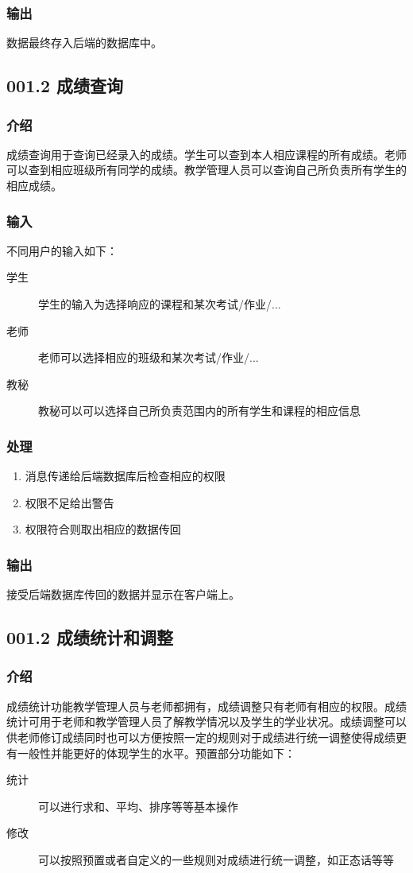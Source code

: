     \subsubsection{输出}
    数据最终存入后端的数据库中。

  \subsection{001.2 成绩查询}
    \subsubsection{介绍}
    成绩查询用于查询已经录入的成绩。学生可以查到本人相应课程的所有成绩。老师可以查到相应班级所有同学的成绩。教学管理人员可以查询自己所负责所有学生的相应成绩。
    \subsubsection{输入}
    不同用户的输入如下：
    \begin{center}\begin{description}
      \item[学生] 学生的输入为选择响应的课程和某次考试/作业/...
      \item[老师] 老师可以选择相应的班级和某次考试/作业/...
      \item[教秘] 教秘可以可以选择自己所负责范围内的所有学生和课程的相应信息
    \end{description}\end{center}
    \subsubsection{处理}
    \begin{enumerate}
      \item 消息传递给后端数据库后检查相应的权限
      \item 权限不足给出警告
      \item 权限符合则取出相应的数据传回
    \end{enumerate}
    \subsubsection{输出}
    接受后端数据库传回的数据并显示在客户端上。

  \subsection{001.2 成绩统计和调整}
    \subsubsection{介绍}
    成绩统计功能教学管理人员与老师都拥有，成绩调整只有老师有相应的权限。成绩统计可用于老师和教学管理人员了解教学情况以及学生的学业状况。成绩调整可以供老师修订成绩同时也可以方便按照一定的规则对于成绩进行统一调整使得成绩更有一般性并能更好的体现学生的水平。预置部分功能如下：
    \begin{description}
      \item[统计] 可以进行求和、平均、排序等等基本操作
      \item[修改] 可以按照预置或者自定义的一些规则对成绩进行统一调整，如正态话等等
    \end{description}
